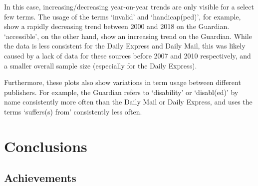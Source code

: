 \documentclass{report}
\begin{document}
In this case, increasing/decreasing year-on-year trends are only visible for a select few terms.
The usage of the terms `invalid' and `handicap(ped)', for example, show a rapidly decreasing trend between 2000 and 2018 on the Guardian.
`accessible', on the other hand, show an increasing trend on the Guardian.
While the data is less consistent for the Daily Express and Daily Mail, this was likely caused by a lack of data for these sources before 2007 and 2010 respectively, and a smaller overall sample size (especially for the Daily Express).

Furthermore, these plots also show variations in term usage between different publishers.
For example, the Guardian refers to `disability' or `disabl(ed)' by name consistently more often than the Daily Mail or Daily Express, and uses the terms `suffers(s) from' consistently less often.






\chapter{Conclusions} \label{Conclusions}  %


\section{Achievements} \label{Achievements}
\end{document}
